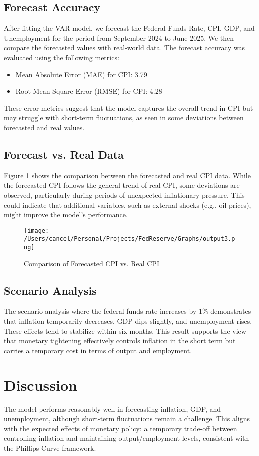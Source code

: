 \documentclass{article}
\begin{document}
\subsection{Forecast Accuracy}
After fitting the VAR model, we forecast the Federal Funds Rate, CPI, GDP, and Unemployment for the period from September 2024 to June 2025. We then compare the forecasted values with real-world data. The forecast accuracy was evaluated using the following metrics:
\begin{itemize}
    \item Mean Absolute Error (MAE) for CPI: 3.79
    \item Root Mean Square Error (RMSE) for CPI: 4.28
\end{itemize}
These error metrics suggest that the model captures the overall trend in CPI but may struggle with short-term fluctuations, as seen in some deviations between forecasted and real values.

\subsection{Forecast vs. Real Data}
Figure \ref{fig:cpi_comparison} shows the comparison between the forecasted and real CPI data. While the forecasted CPI follows the general trend of real CPI, some deviations are observed, particularly during periods of unexpected inflationary pressure. This could indicate that additional variables, such as external shocks (e.g., oil prices), might improve the model’s performance.

\begin{figure}[H]
    \centering
    \texttt{[image: /Users/cancel/Personal/Projects/FedReserve/Graphs/output3.png]}
    \caption{Comparison of Forecasted CPI vs. Real CPI}
    \label{fig:cpi_comparison}
\end{figure}

\subsection{Scenario Analysis}
The scenario analysis where the federal funds rate increases by 1\% demonstrates that inflation temporarily decreases, GDP dips slightly, and unemployment rises. These effects tend to stabilize within six months. This result supports the view that monetary tightening effectively controls inflation in the short term but carries a temporary cost in terms of output and employment.

\section{Discussion}
The model performs reasonably well in forecasting inflation, GDP, and unemployment, although short-term fluctuations remain a challenge. This aligns with the expected effects of monetary policy: a temporary trade-off between controlling inflation and maintaining output/employment levels, consistent with the Phillips Curve framework.
\end{document}
